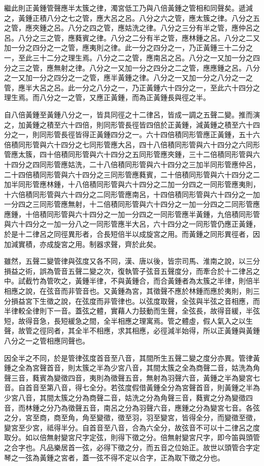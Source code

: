 \begin{pinyinscope}
繼此則正黃鍾管聲應半太簇之律，濁宮低工乃與八倍黃鍾之管相和同聲矣。遞減之，黃鍾正積八分之七之管，應大呂之呂。八分之六之管，應太簇之律。八分之五之管，應夾鍾之呂。八分之四之管，應姑洗之律。八分之三分有半之管，應仲呂之呂。八分之三之管，應蕤賓之律。八分之二分有半之管，應林鍾之呂。八分之二又加一分之四分之一之管，應夷則之律。此一分之四分之一，乃正黃鍾三十二分之一，至此三十二分之理生焉。八分之二之管，應南呂之呂。八分之一又加一分之四分之三之管，應無射之律。八分之一又加一分之四分之二之管，應應鍾之呂。八分之一又加一分之四分之一之管，應半黃鍾之律。八分之一又加一分之八分之一之管，應半大呂之呂。此一分之八分之一，乃正黃鍾六十四分之一，至此六十四分之理生焉。而八分之一之管，又應正黃鍾，而為正黃鍾長與徑之半。

自八倍黃鍾至黃鍾八分之一，皆具同徑之十二律呂，皆成一調之五聲二變。推而演之，加黃鍾之積至六十四倍，則同形管長徑皆四倍於正黃鍾，減黃鍾之積至六十四分之一，則同形管長徑皆得正黃鍾四分之一。六十四倍積同形管應正黃鍾，五十六倍積同形管與六十四分之七同形管應大呂，四十八倍積同形管與六十四分之六同形管應太簇，四十倍積同形管與六十四分之五同形管應夾鍾，三十二倍積同形管與六十四分之四同形管應姑洗，二十八倍積同形管與六十四分之三加半同形管應仲呂，二十四倍積同形管與六十四分之三同形管應蕤賓，二十倍積同形管與六十四分之二加半同形管應林鍾，十八倍積同形管與六十四分之二加一分四之一同形管應夷則，十六倍積同形管與六十四分之二同形管應南呂，十四倍積同形管與六十四分之一加一分四之三同形管應無射，十二倍積同形管與六十四分之一加一分四之二同形管應應鍾，十倍積同形管與六十四分之一加一分四之一同形管應半黃鍾，九倍積同形管與六十四分之一加一分八之一同形管應半大呂，六十四分之一同形管仍應正黃鍾，於是十二律呂之同徑異形者，合長短倍半以成旋宮之用。而黃鍾之同形異徑者，因加減實積，亦成旋宮之用。制器求聲，齊於此矣。

雖然，五聲二變管律與弦度又各不同，漢、唐以後，皆宗司馬、淮南之說，以三分損益之術，誤為管音五聲二變之次，復執管子弦音五聲度分，而牽合於十二律呂之中。試截竹為管吹之，黃鍾半律，不與黃鍾合，而合黃鍾者為太簇之半律，則倍半相應之說，在弦音而非管音也。又黃鍾為宮，其徵聲不應於林鍾而應於夷則，則三分損益宮下生徵之說，在弦度而非管律也。以弦度取聲，全弦與半弦之音相應，而半律較全律則下一音。蓋弦之體，實藉人力鼓動而生聲，全弦長，故得音緩，半弦短，故得音急，長短緩急之間，全半相應之理寓焉。管之體虛，假人氣入之以生聲，故管之徑同者，其全半不相應，求其相應，必徑減半始得，所以正黃鍾與黃鍾八分之一之管相應同聲也。

因全半之不同，於是管律弦度首音至八音，其間所生五聲二變之度分亦異。管律黃鍾之全為宮聲首音，則太簇之半為少宮八音，其間太簇之全為商聲二音，姑洗為角聲三音，蕤賓為變徵四音，夷則為徵聲五音，無射為羽聲六音，黃鍾之半為變宮七音。自首音至第八音，得七全分。若弦度假借黃鍾全分為宮聲首音，則黃鍾之半為少宮八音，其間太簇之分為商聲二音，姑洗之分為角聲三音，蕤賓之分為變徵四音，而林鍾之分乃為徵聲五音，南呂之分為羽聲六音，應鍾之分為變宮七音。各弦之分，宮至商，商至角，角至變徵，徵至羽，羽至變宮，皆得全分，而變徵至徵，變宮至少宮，祗得半分。自首音至八音，合為六全分，故弦音不可以十二律呂之度取分。如以倍無射變宮尺字定弦，則得下徵之分。倍無射變宮尺字，即今笛與頭管之合字也。凡品樂居首一弦，必得下徵之分，而五音之位始正。故世以頭管合字定琴之一弦為黃鍾之宮者，蓋一弦不得不定以合字，正為取下徵之分也。


\end{pinyinscope}

